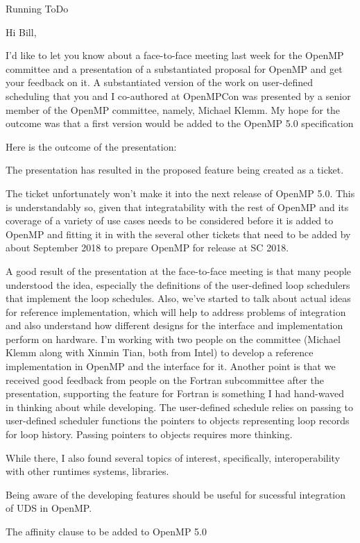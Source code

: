 \begin{columns}
\begin{column}{0.6\linewidth}
\begin{block}{Running ToDo}
\begin{enumerate}
Hi Bill,

I’d like to let you know about a face-to-face meeting last week for
the OpenMP committee and a presentation of a substantiated proposal
for OpenMP and get your feedback on it. A substantiated version of the work on user-defined scheduling that
you and I co-authored at OpenMPCon was presented by a senior member of
the OpenMP committee, namely, Michael Klemm. My hope for the outcome
was that a first version would be added to the OpenMP 5.0
specification 

Here is the outcome of the presentation: 

The presentation has resulted in the proposed feature being created as
a ticket. 

The ticket unfortunately won't make it into the next release of OpenMP
5.0. This is understandably so, given that integratability with the
rest of OpenMP and its coverage of a variety of use cases needs to be
considered before it is added to OpenMP and fitting it in with the
several other tickets that need to be added by about September 2018 to
prepare OpenMP for release at SC 2018. 

A good result of the presentation at the face-to-face meeting is that
many people understood the idea, especially the definitions of the
user-defined loop schedulers that implement the loop schedules. Also, 
we've started to talk about actual ideas for reference implementation,
which will help to address problems of integration and also understand
how different designs for the interface and implementation perform on
hardware. I'm working with two people on the committee (Michael Klemm
along with Xinmin Tian, both from Intel) to develop a reference
implementation in OpenMP and the interface for it. Another point is
that we received good feedback from people on the Fortran subcommittee
after the presentation, supporting the feature for Fortran is something I had hand-waved in
thinking about while developing. The user-defined schedule relies on
passing to user-defined scheduler functions the pointers to objects
representing loop records for loop history. Passing pointers to
objects requires more thinking. 

While there, I also found several topics of interest, specifically,
interoperability with other runtimes systems, libraries. 

Being aware of the developing features should be useful for sucessful
integration of UDS in OpenMP. 

The affinity clause to be added to OpenMP 5.0 


\end{enumerate}
\end{block}
\end{column}
\end{columns}
